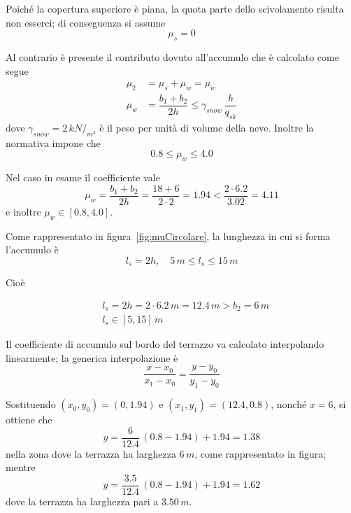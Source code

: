 Poiché la copertura superiore è piana, la quota parte dello scivolamento risulta non esserci; di conseguenza si assume
\[
	\mu_s = 0
\]

Al contrario è presente il contributo dovuto all'accumulo che è calcolato come segue
\begin{align*}
 \mu_2 &= \mu_s + \mu_w = \mu_w\\
 \mu_w &=  \dfrac{b_1 + b_2}{2 h}\leq \gamma_{snow}\,\dfrac{h}{q_{sk}}
\end{align*}
dove $\gamma_{snow} = 2\,kN/_{m^3}$ è il peso per unità di volume della neve. Inoltre la normativa impone che 
\[
 0.8 \leq \mu_w \leq 4.0
\]

Nel caso in esame il coefficiente vale
\[
 \mu_w =  \dfrac{b_1 + b_2}{2 h} = \dfrac{18+6}{2\cdot 2} = 1.94 < \dfrac{2\cdot 6.2}{3.02} = 4.11
\]
e inoltre $\mu_w \in [0.8, 4.0]$.


Come rappresentato in figura~\ref{fig:muCircolare}, la lunghezza in cui si forma l'accumulo è
\[
 l_s = 2 h, \quad 5\,m\leq l_s \leq 15\,m
\]

Cioè

\begin{align*}
  &l_s = 2 h = 2\cdot 6.2\,m = 12.4\,m > b_2 = 6\,m\\
  &l_s \in [5, 15]\,m
\end{align*}

Il coefficiente di accumulo sul bordo del terrazzo va calcolato interpolando linearmente; la generica interpolazione è
\[
 \dfrac{x-x_0}{x_1-x_0} = \dfrac{y-y_0}{y_1-y_0}
\]

Sostituendo $(x_0, y_0) = (0, 1.94)$ e $(x_1, y_1) = (12.4, 0.8)$, nonché $x = 6$, si ottiene che
\[ 
 y = \dfrac{6}{12.4}\,(0.8-1.94) + 1.94 = 1.38
\]
nella zona dove la terrazza ha larghezza $6\,m$, come rappresentato in figura; mentre
\[
 y = \dfrac{3.5}{12.4}\,(0.8-1.94) + 1.94 = 1.62
\]
dove la terrazza ha larghezza pari a $3.50\,m$.







